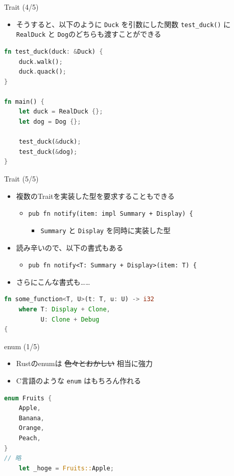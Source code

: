 \documentclass[cjk,dvipdfmx,10pt,compress,fragile%
hyperref={bookmarks=true,bookmarksnumbered=true,bookmarksopen=false,%
colorlinks=false,%
pdftitle={第 134 回 関西 Debian 勉強会},%
pdfauthor={小林},%
pdfsubject={資料},%
}]{beamer}
\begin{document}
\begin{frame}[t,fragile]{Trait (4/5)}
\begin{itemize}
 \item そうすると、以下のように \texttt{Duck} を引数にした関数 \verb|test_duck()| に\\
       \texttt{RealDuck} と \texttt{Dog}のどちらも渡すことができる
\end{itemize}
\begin{lstlisting}[language=Rust,style=boxed,style=colouredRust,basicstyle=\small\tt,lineskip=-2pt]
fn test_duck(duck: &Duck) {
    duck.walk();
    duck.quack();
}

fn main() {
    let duck = RealDuck {};
    let dog = Dog {};

    test_duck(&duck);
    test_duck(&dog);
}\end{lstlisting}
\end{frame}

\begin{frame}[t,fragile]{Trait (5/5)}
 \begin{itemize}
  \item 複数のTraitを実装した型を要求することもできる
	\begin{itemize}
	 \item \verb|pub fn notify(item: impl Summary + Display) {|
	       \begin{itemize}
		\item \verb|Summary| と \verb|Display| を同時に実装した型
	       \end{itemize}
	\end{itemize}
  \item 読み辛いので、以下の書式もある
	\begin{itemize}
	 \item \verb|pub fn notify<T: Summary + Display>(item: T) {|
	\end{itemize}
  \item さらにこんな書式も……
 \end{itemize}
\begin{lstlisting}[language=Rust,style=boxed,style=colouredRust,basicstyle=\small\tt,lineskip=-2pt]
fn some_function<T, U>(t: T, u: U) -> i32
    where T: Display + Clone,
          U: Clone + Debug
{\end{lstlisting}
\end{frame}

\begin{frame}[t,fragile]{enum (1/5)}
 \begin{itemize}
  \item Rustのenumは \sout{色々とおかしい} 相当に強力
  \item C言語のような \texttt{enum} はもちろん作れる
 \end{itemize}
\begin{lstlisting}[language=Rust,style=boxed,style=colouredRust,basicstyle=\small\tt,lineskip=-2pt]
enum Fruits {
    Apple,
    Banana,
    Orange,
    Peach,
}
// 略
    let _hoge = Fruits::Apple;\end{lstlisting}
\end{frame}
\end{document}
